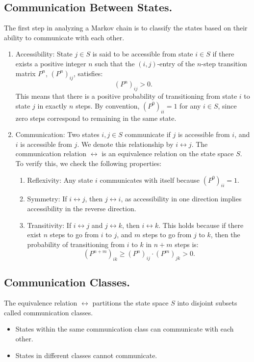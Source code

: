 \subsection{Communication Between States.}  
The first step in analyzing a Markov chain is to classify the states based on their ability to communicate with each other. 
\begin{enumerate}
    \item Accessibility: State \( j \in S \) is said to be accessible from state \( i \in S \) if there exists a positive integer \( n \) such that the \( (i,j) \)-entry of the \( n \)-step transition matrix \( P^n \), \( (P^n)_{ij} \), satisfies:
\[
(P^n)_{ij} > 0.
\]
This means that there is a positive probability of transitioning from state \( i \) to state \( j \) in exactly \( n \) steps. By convention, \( (P^0)_{ii} = 1 \) for any \( i \in S \), since zero steps correspond to remaining in the same state.
    \item Communication: Two states \( i, j \in S \) communicate if \( j \) is accessible from \( i \), and \( i \) is accessible from \( j \). We denote this relationship by \( i \leftrightarrow j \). The communication relation \( \leftrightarrow \) is an equivalence relation on the state space \( S \). To verify this, we check the following properties:
    \begin{enumerate}
        \item Reflexivity: Any state \( i \) communicates with itself because \( (P^0)_{ii} = 1 \).
        \item Symmetry: If \( i \leftrightarrow j \), then \( j \leftrightarrow i \), as accessibility in one direction implies accessibility in the reverse direction. 
        \item Transitivity: If \( i \leftrightarrow j \) and \( j \leftrightarrow k \), then \( i \leftrightarrow k \). This holds because if there exist \( n \) steps to go from \( i \) to \( j \), and \( m \) steps to go from \( j \) to \( k \), then the probability of transitioning from \( i \) to \( k \) in \( n+m \) steps is:
           \[
           (P^{n+m})_{ik} \geq (P^n)_{ij} \cdot (P^m)_{jk} > 0.
           \]
    \end{enumerate} 
\end{enumerate}

\subsection{Communication Classes.}  
The equivalence relation \( \leftrightarrow \) partitions the state space \( S \) into disjoint subsets called communication classes.  
\begin{itemize}
    \item States within the same communication class can communicate with each other.
    \item States in different classes cannot communicate.
\end{itemize}

